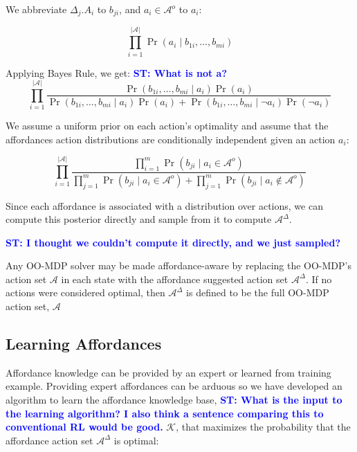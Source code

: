 \documentclass[conference]{IEEEtran}
\newcommand{\stnote}[1]{\textcolor{Blue}{\textbf{ST: #1}}}
\begin{document}
We abbreviate $\Delta_j.A_i$ to $b_{ji}$, and $a_i \in \mathcal{A}^o$ to $a_i$:

\begin{equation}
\prod_{i=1}^{|\mathcal{A}|}\Pr(a_i \mid b_{1i}, \ldots, b_{mi})
\end{equation}

Applying Bayes Rule, we get:
\stnote{What is not a?}
\begin{equation}
\prod_{i=1}^{|\mathcal{A}|} \frac{\Pr(b_{1i}, \ldots, b_{mi} \mid a_i) \Pr(a_i)}{\Pr(b_{1i}, \ldots, b_{mi} \mid a_i) \Pr(a_i) + \Pr(b_{1i}, \ldots, b_{mi} \mid \neg a_i) \Pr(\neg a_i)}
\end{equation}

We assume a uniform prior on each action's optimality and assume that 
the affordances action distributions are conditionally independent given an action $a_i$:



\begin{equation}
\prod_{i=1}^{|\mathcal{A}|} \frac{\prod_{i=1}^m \Pr(b_{ji} \mid a_i \in \mathcal{A}^o)}{\prod_{j=1}^m\Pr(b_{ji} \mid a_i \in \mathcal{A}^o) + \prod_{j=1}^m\Pr(b_{ji} \mid a_i \not\in \mathcal{A}^o)}
\label{eq:posterior}
\end{equation}

Since each affordance is associated with a distribution over actions, we can compute this posterior directly and sample from it
to compute $\mathcal{A}^\Delta$.

\stnote{I thought we couldn't compute it directly, and we just sampled?}

Any OO-MDP solver may be made affordance-aware by replacing the 
OO-MDP's action set $\mathcal{A}$ in each state with the affordance 
suggested action set $\mathcal{A}^\Delta$. If no actions were considered optimal,
then $\mathcal{A}^\Delta$ is defined to be the full OO-MDP action set, $\mathcal{A}$

\subsection{Learning Affordances}

Affordance knowledge can be provided by an expert or learned from
training example.  Providing expert affordances can be arduous so we
have developed an algorithm to learn the affordance knowledge base,
\stnote{What is the input to the learning algorithm?  I also think a sentence comparing this to conventional RL would be good.} 
$\mathcal{K}$, that maximizes the probability that the affordance
action set $\mathcal{A}^\Delta$ is optimal:
\end{document}
